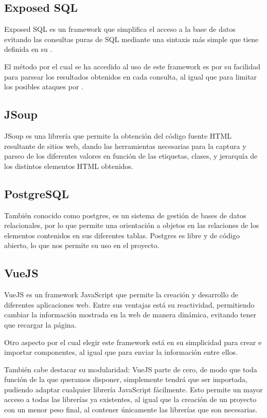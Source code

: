     \subsection{Exposed SQL}

Exposed SQL es un framework que simplifica el acceso a la base de datos evitando las consultas puras de SQL mediante una sintaxis más simple que tiene definida en su .~\cite{exposedsql}

El método por el cual se ha accedido al uso de este framework es por su facilidad para parsear los resultados obtenidos en cada consulta, al igual que para limitar los posibles ataques por .

    \subsection{JSoup}

JSoup es una librería que permite la obtención del código fuente HTML resultante de sitios web, dando las herramientas necesarias para la captura y parseo de los diferentes valores en función de las etiquetas, clases, y jerarquía de los distintos elementos HTML obtenidos.~\cite{jsoup}
    
    \subsection{PostgreSQL}
    \label{postgresql}
También conocido como postgres, es un sistema de gestión de bases de datos relacionales, por lo que permite una orientación a objetos en las relaciones de los elementos contenidos en sus diferentes tablas.
Postgres es libre y de código abierto, lo que nos permite su uso en el proyecto.

    \subsection{VueJS}
    \label{Vue}

VueJS es un framework JavaScript que permite la creación y desarrollo de diferentes aplicaciones web.
Entre sus ventajas está su reactividad, permitiendo cambiar la información mostrada en la web de manera dinámica, evitando tener que recargar la página. 

Otro aspecto por el cual elegir este framework está en su simplicidad para crear e importar componentes, al igual que para enviar la información entre ellos.

También cabe destacar su modularidad: VueJS parte de cero, de modo que toda función de la que queramos disponer, simplemente tendrá que ser importada, pudiendo adaptar cualquier librería JavaScript fácilmente. Esto permite un mayor acceso a todas las librerías ya existentes, al igual que la creación de un proyecto con un menor peso final, al contener únicamente las librerías que son necesarias.


